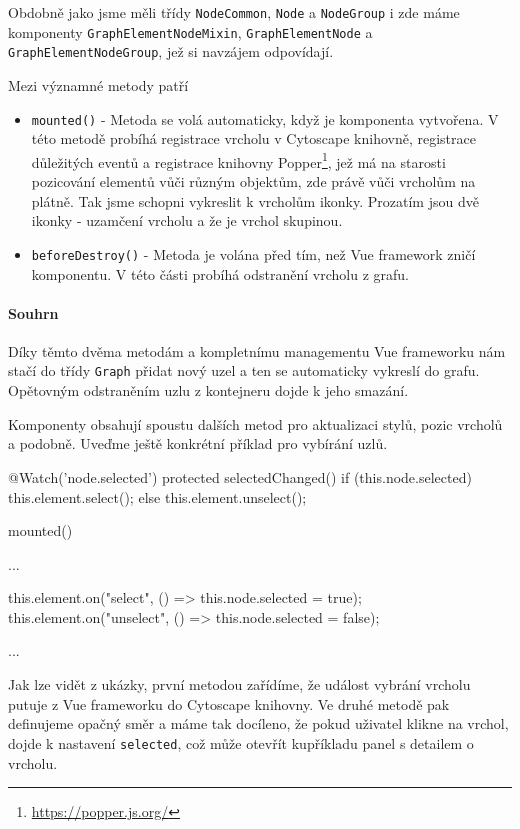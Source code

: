 Obdobně jako jsme měli třídy \texttt{NodeCommon}, \texttt{Node} a \texttt{NodeGroup} i zde máme komponenty \texttt{GraphElementNodeMixin}, \texttt{GraphElementNode} a \\\texttt{GraphElementNodeGroup}, jež si navzájem odpovídají.

Mezi významné metody patří
\begin{itemize}
  \item \texttt{mounted()} - Metoda se volá automaticky, když je komponenta vytvořena. V této metodě probíhá registrace vrcholu v Cytoscape knihovně, registrace důležitých eventů a registrace knihovny Popper\footnote{\url{https://popper.js.org/}}, jež má na starosti pozicování elementů vůči různým objektům, zde právě vůči vrcholům na plátně. Tak jsme schopni vykreslit k vrcholům ikonky. Prozatím jsou dvě ikonky - uzamčení vrcholu a že je vrchol skupinou.
  \item \texttt{beforeDestroy()} - Metoda je volána před tím, než Vue framework zničí komponentu. V této části probíhá odstranění vrcholu z grafu.
\end{itemize}

\paragraph{Souhrn} Díky těmto dvěma metodám a kompletnímu managementu Vue frameworku nám stačí do třídy \texttt{Graph} přidat nový uzel a ten se automaticky vykreslí do grafu. Opětovným odstraněním uzlu z kontejneru dojde k jeho smazání.


\newpage
Komponenty obsahují spoustu dalších metod pro aktualizaci stylů, pozic vrcholů a podobně. Uveďme ještě konkrétní příklad pro vybírání uzlů.
\begin{code}
@Watch('node.selected')
protected selectedChanged() {
    if (this.node.selected) {
        this.element.select();
    } else {
        this.element.unselect();
    }
}

mounted() {
    ...

    this.element.on("select", () => this.node.selected = true);
    this.element.on("unselect", () => this.node.selected = false);

    ...
}
\end{code}

Jak lze vidět z ukázky, první metodou zařídíme, že událost vybrání vrcholu putuje z Vue frameworku do Cytoscape knihovny. Ve druhé metodě pak definujeme opačný směr a máme tak docíleno, že pokud uživatel klikne na vrchol, dojde k nastavení \texttt{selected}, což může otevřít kupříkladu panel s detailem o vrcholu.

